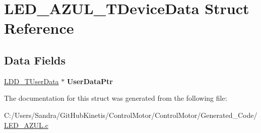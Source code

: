 \hypertarget{struct_l_e_d___a_z_u_l___t_device_data}{}\section{L\+E\+D\+\_\+\+A\+Z\+U\+L\+\_\+\+T\+Device\+Data Struct Reference}
\label{struct_l_e_d___a_z_u_l___t_device_data}
\subsection*{Data Fields}
\begin{DoxyCompactItemize}
\item 
\hyperlink{group___p_e___types__module_ga0b66a73f87238a782318aa0be7578e35}{L\+D\+D\+\_\+\+T\+User\+Data} $\ast$ {\bfseries User\+Data\+Ptr}\hypertarget{struct_l_e_d___a_z_u_l___t_device_data_adfff8e133e8409a52c0943cdf195ac40}{}\label{struct_l_e_d___a_z_u_l___t_device_data_adfff8e133e8409a52c0943cdf195ac40}

\end{DoxyCompactItemize}


The documentation for this struct was generated from the following file\+:\begin{DoxyCompactItemize}
\item 
C\+:/\+Users/\+Sandra/\+Git\+Hub\+Kinetis/\+Control\+Motor/\+Control\+Motor/\+Generated\+\_\+\+Code/\hyperlink{_l_e_d___a_z_u_l_8c}{L\+E\+D\+\_\+\+A\+Z\+U\+L.\+c}\end{DoxyCompactItemize}
